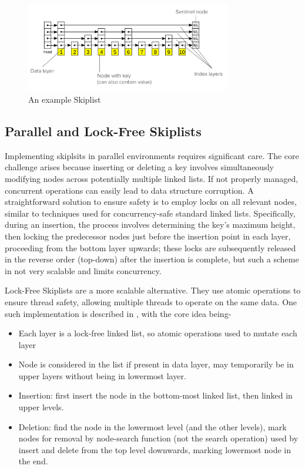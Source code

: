 \documentclass[12pt,a4paper]{article}
\begin{document}
\begin{figure}[H]
    \centering
    \includegraphics[width=0.8\textwidth]{1.png}
    \caption{An example Skiplist}
\end{figure}



\subsection{Parallel and Lock-Free Skiplists}
Implementing skiplsits in parallel environments requires significant care. The core challenge arises because inserting or deleting a key involves simultaneously modifying nodes across potentially multiple linked lists. If not properly managed, concurrent operations can easily lead to data structure corruption. A straightforward solution to ensure safety is to employ locks on all relevant nodes, similar to techniques used for concurrency-safe standard linked lists. Specifically, during an insertion, the process involves determining the key's maximum height, then locking the predecessor nodes just before the insertion point in each layer, proceeding from the bottom layer upwards; these locks are subsequently released in the reverse order (top-down) after the insertion is complete, but such a scheme in not very scalable and limits concurrency.

Lock-Free Skiplists are a more scalable alternative. They use atomic operations to ensure thread safety, allowing multiple threads to operate on the same data. One such implementation is described in \citep{herlihy2012art}, with the core idea being-

\begin{itemize}
    \item Each layer is a lock-free linked list, so atomic operations used to mutate each layer
    \item Node is considered in the list if present in data layer, may temporarily be in upper layers without being in lowermost layer.
    \item Insertion: first insert the node in the bottom-most linked list, then linked in upper levels.
    \item Deletion: find the node in the lowermost level (and the other levels), mark nodes for removal by node-search function (not the search operation) used by insert and delete from the top level downwards, marking lowermost node in the end.
\end{itemize}
\end{document}
